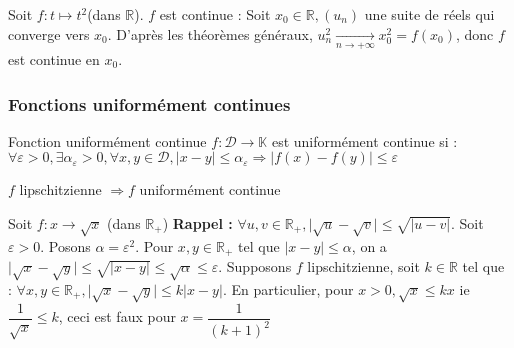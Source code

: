 \documentclass[12pt,a4paper]{report}
\begin{document}
\begin{remarque}
Soit $f : t \mapsto t^2 $(dans $\mathbb{R}$). $f$ est continue : 
\newline Soit $x_0 \in \mathbb{R}, (u_n)$ une suite de réels qui converge vers $x_0$. \newline D'après les théorèmes généraux, $u_n^2 \xrightarrow[n \rightarrow +\infty]{} x_0^2 = f(x_0)$, donc $f$ est continue en $x_0$.
\end{remarque}


\subsubsection{Fonctions uniformément continues}
\begin{definition}{Fonction uniformément continue}{}
$f : \mathcal{D} \rightarrow \mathbb{K}$ est uniformément continue si : \newline $\forall \varepsilon > 0, \exists \alpha_\varepsilon > 0, \forall x,y \in \mathcal{D}, \lvert x-y \rvert \leq \alpha_\varepsilon \Longrightarrow \lvert f(x)-f(y) \rvert \leq \varepsilon$
\end{definition}

\begin{remarque}
$f$ lipschitzienne $\Longrightarrow f$ uniformément continue
\end{remarque} 

\begin{exemple}
Soit $f : x \rightarrow \sqrt{x}$ (dans $\mathbb{R}_+$)
\newline \textbf{Rappel :} $\forall u,v \in \mathbb{R}_+, \lvert \sqrt{u} - \sqrt{v} \rvert \leq \sqrt{\lvert u-v \rvert}$.
\newline Soit $\varepsilon > 0$. Posons $\alpha = \varepsilon^2$. \newline Pour $x,y \in \mathbb{R}_+$ tel que $\lvert x-y \rvert \leq \alpha$, on a 
$\lvert \sqrt{x}-\sqrt{y}  \rvert \leq \sqrt{\lvert x-y \rvert} \leq \sqrt{\alpha} \leq \varepsilon$. 
\newline \newline
Supposons $f$ lipschitzienne, soit $k \in \mathbb{R}$ tel que : \newline $\forall x,y \in \mathbb{R}_+, \lvert \sqrt{x} - \sqrt{y} \rvert \leq k \lvert x-y \rvert$. \newline
En particulier, pour $x > 0, \sqrt{x} \leq kx$ ie $\dfrac{1}{\sqrt{x}} \leq k$, ceci est faux pour $x = \dfrac{1}{(k+1)^2}$
\end{exemple}
\end{document}
